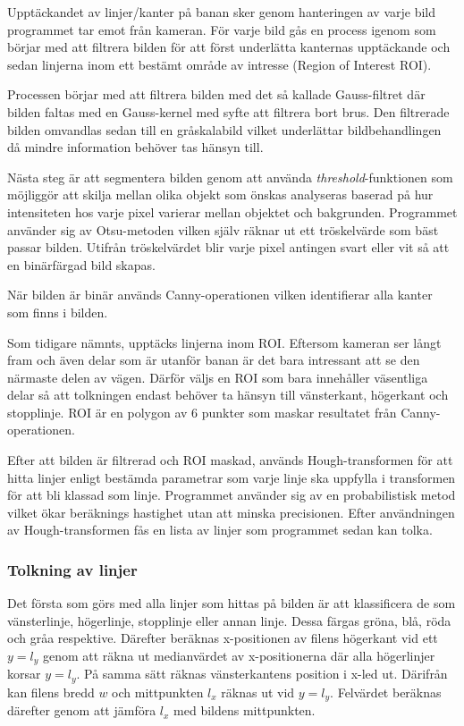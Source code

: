 \documentclass[tekniskrapport/tech.tex]{subfiles}
\begin{document}
Upptäckandet av linjer/kanter på banan sker genom hanteringen av varje bild
programmet tar emot från kameran. För varje bild gås en process igenom som
börjar med att filtrera bilden för att först underlätta kanternas upptäckande
och sedan linjerna inom ett bestämt område av intresse (Region of Interest
ROI).

Processen börjar med att filtrera bilden med det så kallade Gauss-filtret där
bilden faltas med en Gauss-kernel med syfte att filtrera bort brus. Den
filtrerade bilden omvandlas sedan till en gråskalabild vilket underlättar
bildbehandlingen då mindre information behöver tas hänsyn till.

Nästa steg är att segmentera bilden genom att använda
\emph{threshold}-funktionen som möjliggör att skilja mellan olika objekt som
önskas analyseras baserad på hur intensiteten hos varje pixel varierar mellan
objektet och bakgrunden. Programmet använder sig av Otsu-metoden vilken själv
räknar ut ett tröskelvärde som bäst passar bilden. Utifrån tröskelvärdet blir
varje pixel antingen svart eller vit så att en binärfärgad bild skapas.

När bilden är binär används Canny-operationen vilken identifierar alla kanter
som finns i bilden.

Som tidigare nämnts, upptäcks linjerna inom ROI. Eftersom kameran ser långt
fram och även delar som är utanför banan är det bara intressant att se den
närmaste delen av vägen. Därför väljs en ROI som bara innehåller väsentliga
delar så att tolkningen endast behöver ta hänsyn till vänsterkant, högerkant
och stopplinje. ROI är en polygon av 6 punkter som maskar resultatet från
Canny-operationen.

Efter att bilden är filtrerad och ROI maskad, används Hough-transformen för att
hitta linjer enligt bestämda parametrar som varje linje ska uppfylla i
transformen för att bli klassad som linje. Programmet använder sig av en
probabilistisk metod vilket ökar beräknings hastighet utan att minska
precisionen. Efter användningen av Hough-transformen fås en lista av linjer som
programmet sedan kan tolka.

\subsubsection{Tolkning av linjer}
Det första som görs med alla linjer som hittas på bilden är att klassificera de
som vänsterlinje, högerlinje, stopplinje eller annan linje. Dessa färgas gröna,
blå, röda och gråa respektive. Därefter beräknas x-positionen av filens
högerkant vid ett $y=l_y$ genom att räkna ut medianvärdet av x-positionerna där
alla högerlinjer korsar $y=l_y$. På samma sätt räknas vänsterkantens position i
x-led ut. Därifrån kan filens bredd $w$ och mittpunkten $l_x$ räknas ut vid
$y=l_y$. Felvärdet beräknas därefter genom att jämföra $l_x$ med bildens
mittpunkten.
\end{document}
